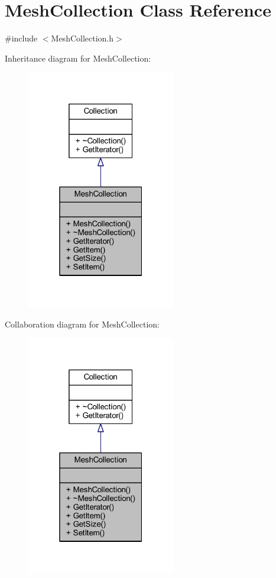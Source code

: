 \hypertarget{class_mesh_collection}{}\section{Mesh\+Collection Class Reference}
\label{class_mesh_collection}


{\ttfamily \#include $<$Mesh\+Collection.\+h$>$}



Inheritance diagram for Mesh\+Collection\+:
\nopagebreak
\begin{figure}[H]
\begin{center}
\leavevmode
\includegraphics[width=184pt]{class_mesh_collection__inherit__graph}
\end{center}
\end{figure}


Collaboration diagram for Mesh\+Collection\+:
\nopagebreak
\begin{figure}[H]
\begin{center}
\leavevmode
\includegraphics[width=184pt]{class_mesh_collection__coll__graph}
\end{center}
\end{figure}
